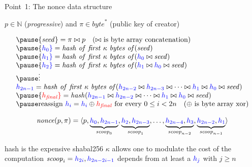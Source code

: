 \documentclass[11pt]{beamer}  %
\newcommand{\nonce}{{\mathit{nonce}}}
\newcommand{\scoop}{{\mathit{scoop}}}
\newcommand{\seed}{{\mathit{seed}}}
\newcommand{\hash}{{\mathit{hash}}}
\newcommand{\hashfirstk}{{\mathit{hash\ of\ first\ \kappa\ bytes\ of}}}
\newcommand{\finalhash}{{h_{\mathit{final}}}}
\begin{document}
\begin{frame}{Point~1: The nonce data structure}
  \begin{center}
    $p\in\mathbb{N}$ (\emph{progressive}) and $\pi\in\mathit{byte}^*$ (public key of creator)
  \end{center}
  \[\begin{array}{l}
  \pause
  \seed=\pi\bowtie p\quad\text{($\bowtie$ is byte array concatenation)}\\
  \pause
  {\color{blue} h_0}=\hashfirstk(\seed)\\
  \pause
  {\color{blue} h_1}=\hashfirstk({\color{blue} h_0}\bowtie\seed)\\
  \pause
  {\color{blue} h_2}=\hashfirstk({\color{blue} h_1}\bowtie{\color{blue}  h_0}\bowtie \seed)\\
  \pause
  \vdots\\
  {\color{blue} h_{2n-1}}=\hashfirstk({\color{blue} h_{2n-2}}\bowtie{\color{blue} h_{2n-3}}\bowtie\cdots\bowtie{\color{blue} h_1}\bowtie{\color{blue} h_0}\bowtie \seed)\\
  \pause
  {\color{red}\finalhash}=\hash({\color{blue} h_{2n-1}}\bowtie{\color{blue} h_{2n-2}}\bowtie\cdots\bowtie{\color{blue} h_1}\bowtie{\color{blue} h_0}\bowtie \seed)\\
  \pause
  \text{reassign }{\color{blue} h_i}={\color{blue} h_i}\oplus{\color{red}\finalhash}\text{ for every }0\le i<2n\quad\text{($\oplus$ is byte array xor)}\\
  \end{array}\]

  \pause

  \[
  \nonce(p,\pi)=\langle p,\underbrace{{\color{blue}h_0},{\color{blue}h_{2n-1}}}_{\scoop_0},\underbrace{{\color{blue}h_2},{\color{blue}h_{2n-3}}}_{\scoop_1},\ldots,\underbrace{{\color{blue}h_{2n-4}},{\color{blue}h_3}}_{\scoop_{n-2}},\underbrace{{\color{blue}h_{2n-2}},{\color{blue}h_1}}_{\scoop_{n-1}}\rangle
  \]

  \begin{overprint}
    \centering hash is the expensive shabal256
    \centering $\kappa$ allows one to modulate the cost of the computation
    \centering $\scoop_i={\color{blue}h_{2i}},{\color{blue}h_{2n-2i-1}}$ depends from at least a ${\color{blue}h_j}$ with $j\ge n$
  \end{overprint}

\end{frame}
\end{document}
